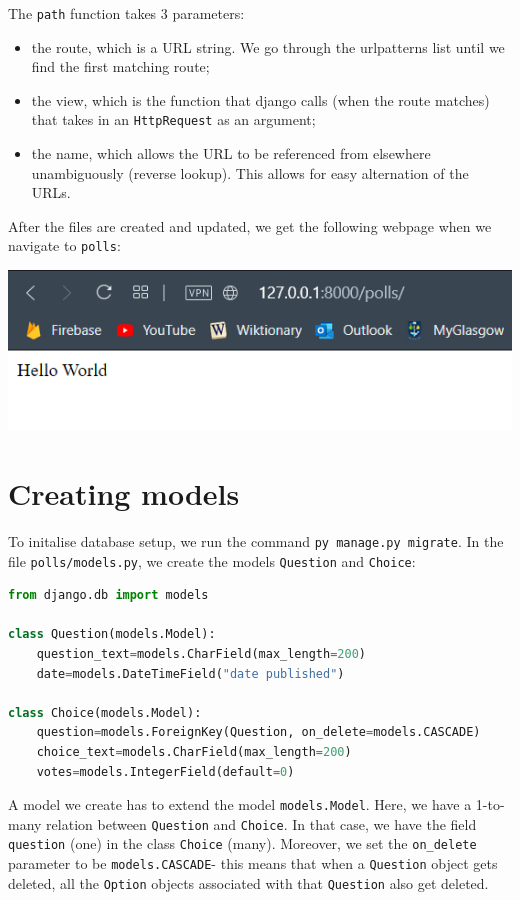 \documentclass[a4paper, openany]{memoir}
\begin{document}
    \noindent The \texttt{path} function takes 3 parameters:
    \begin{itemize}
        \item the route, which is a URL string. We go through the urlpatterns list until we find the first matching route;
        \item the view, which is the function that django calls (when the route matches) that takes in an \texttt{HttpRequest} as an argument;
        \item the name, which allows the URL to be referenced from elsewhere unambiguously (reverse lookup). This allows for easy alternation of the URLs.
    \end{itemize}
    After the files are created and updated, we get the following webpage when we navigate to \texttt{polls}:
    \begin{center}
        \includegraphics[scale=0.8]{src/Django2.PNG}
    \end{center}
    \newpage

    \section{Creating models}
    To initalise database setup, we run the command \texttt{py manage.py migrate}. In the file \texttt{polls/models.py}, we create the models \texttt{Question} and \texttt{Choice}:
\begin{lstlisting}[language=python]
from django.db import models

class Question(models.Model):
    question_text=models.CharField(max_length=200)
    date=models.DateTimeField("date published")

class Choice(models.Model):
    question=models.ForeignKey(Question, on_delete=models.CASCADE)
    choice_text=models.CharField(max_length=200)
    votes=models.IntegerField(default=0)
\end{lstlisting}
    A model we create has to extend the model \texttt{models.Model}. 
    Here, we have a 1-to-many relation between \texttt{Question} and \texttt{Choice}. In that case, we have the field \texttt{question} (one) in the class \texttt{Choice} (many). Moreover, we set the \texttt{on\_delete} parameter to be \texttt{models.CASCADE}- this means that when a \texttt{Question} object gets deleted, all the \texttt{Option} objects associated with that \texttt{Question} also get deleted.
\end{document}

